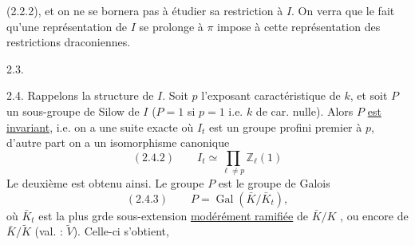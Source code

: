 
(2.2.2), et on ne se bornera pas  à étudier sa restriction à $I$.  On verra que   le fait qu'une représentation de $I$ se prolonge à $\pi$ impose à cette représentation des restrictions draconiennes.

2.3.

2.4. Rappelons la structure de $I$. Soit $p$ l'exposant caractéristique de $k$,  et soit $P$  un  sous-groupe de Silow de $I$ ($P=1$ si $p=1$ i.e. $k$ de car. nulle). Alors $P$ \uline{est invariant}, i.e. on a une suite exacte
où $I_t$  est un groupe profini premier à $p$, d'autre part on a un isomorphisme canonique
\[
(2.4.2)\qquad I_t\simeq\prod_{\ell\ne p}\mathbb Z_\ell(1)
\]
Le deuxième est obtenu ainsi. Le groupe $P$ est le groupe de Galois 
\[
(2.4.3)\qquad P=\operatorname{Gal}(\bar K/\bar K_t),
\]
où $\bar K_t$ est la plus  grde sous-extension \uline{modérément ramifiée} de $\bar K/K$ , ou encore de $\bar K/\widetilde K$ (val. : $\widetilde V$). Celle-ci s'obtient, 
